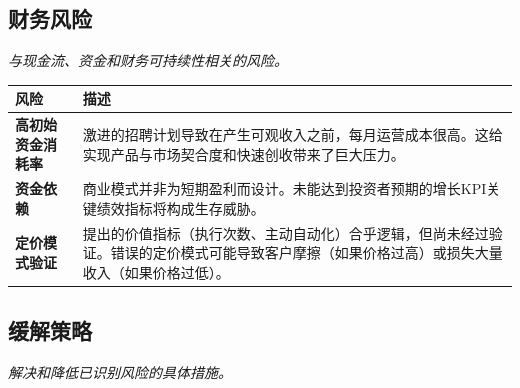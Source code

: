 \documentclass[11点, A4纸, 单面]{article}
\begin{document}
\newpage
\subsection{财务风险}
\textit{与现金流、资金和财务可持续性相关的风险。}

\begin{table}[H]
\centering
\begin{tabularx}{\textwidth}{@{}lL@{}}
\toprule
\textbf{风险} & \textbf{描述} \\
\midrule
\textbf{高初始资金消耗率} & 激进的招聘计划导致在产生可观收入之前，每月运营成本很高。这给实现产品与市场契合度和快速创收带来了巨大压力。 \\
\addlinespace
\textbf{资金依赖} & 商业模式并非为短期盈利而设计。未能达到投资者预期的增长KPI关键绩效指标将构成生存威胁。 \\
\addlinespace
\textbf{定价模式验证} & 提出的价值指标（执行次数、主动自动化）合乎逻辑，但尚未经过验证。错误的定价模式可能导致客户摩擦（如果价格过高）或损失大量收入（如果价格过低）。 \\
\bottomrule
\end{tabularx}
\end{table}

\newpage
\subsection{缓解策略}
\textit{解决和降低已识别风险的具体措施。}
\end{document}
